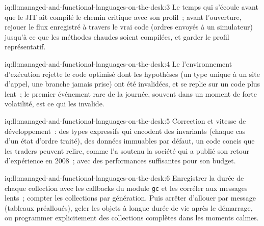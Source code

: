 \begin{solution}{iq:ll:managed-and-functional-languages-on-the-desk:3}
Le temps qui s'écoule avant que le JIT ait compilé le chemin critique avec son profil~; avant l'ouverture, rejouer le flux enregistré à travers le
vrai code (ordres envoyés à un simulateur) jusqu'à ce que les méthodes chaudes soient compilées, et garder le profil représentatif.
\end{solution}

\begin{solution}{iq:ll:managed-and-functional-languages-on-the-desk:4}
Le l'environnement d'exécution rejette le code optimisé dont les hypothèses (un type unique à un site d'appel, une branche jamais prise) ont été invalidées,
et se replie sur un code plus lent~; le premier événement rare de la journée, souvent dans un moment de forte volatilité, est ce qui les invalide.
\end{solution}

\begin{solution}{iq:ll:managed-and-functional-languages-on-the-desk:5}
Correction et vitesse de développement~: des types expressifs qui encodent des invariants (chaque cas d'un état d'ordre traité), des données
immuables par défaut, un code concis que les traders peuvent relire, comme l'a soutenu la société qui a publié son retour d'expérience en 2008~; avec
des performances suffisantes pour son budget.
\end{solution}

\begin{solution}{iq:ll:managed-and-functional-languages-on-the-desk:6}
Enregistrer la durée de chaque collection avec les callbacks du module \texttt{gc} et les corréler aux messages lents~; compter
les collections par génération. Puis arrêter d'allouer par message (tableaux préalloués), geler les objets à longue durée de vie après le démarrage,
ou programmer explicitement des collections complètes dans les moments calmes.
\end{solution}
